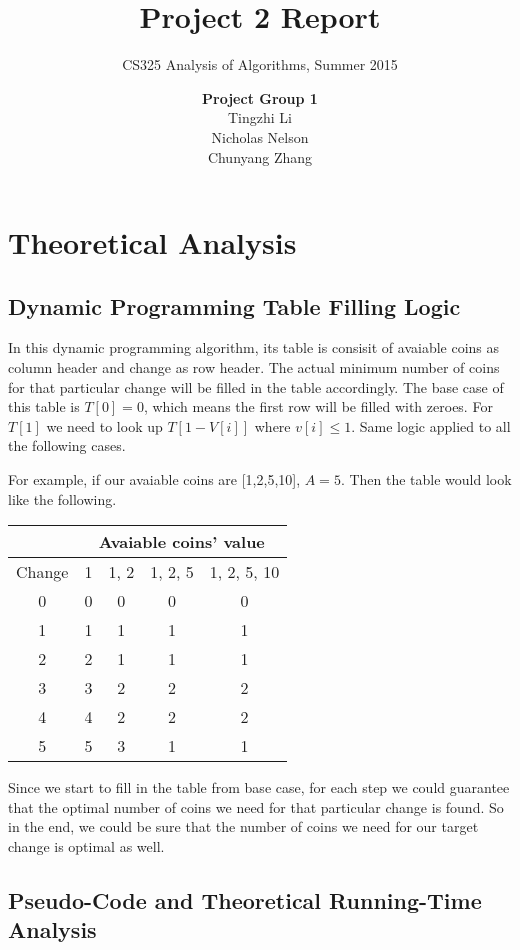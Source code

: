 \documentclass[11pt]{scrreprt}
\title{\textbf{Project 2 Report}}
\subtitle{CS325 Analysis of Algorithms, Summer 2015}
\author{\textsf{\textbf{Project Group 1}}\\
		\textsf{Tingzhi Li}\\
		\textsf{Nicholas Nelson}\\
		\textsf{Chunyang Zhang}}
\date{}
\begin{document}
\maketitle


\chapter{Theoretical Analysis}

\section{Dynamic Programming Table Filling Logic}

In this dynamic programming algorithm, its table is consisit of avaiable coins as column header and change as row header. The actual minimum number of coins for that particular change will be filled in the table accordingly. The base case of this table is $T[0]=0$, which means the first row will be filled with zeroes. For $T[1]$ we need to look up $T[1-V[i]]$ where $v[i]\leq 1$. Same logic applied to all the following cases.

For example, if our avaiable coins are [1,2,5,10], $A=5$. Then the table would look like the following.

\begin{tabular}{|c|c|c|c|c|}
	\hline & \multicolumn{4}{|c|}{Avaiable coins' value} \\
	\hline Change & 1  & 1, 2 & 1, 2, 5 & 1, 2, 5, 10 \\ 
	\hline 0 & 0 & 0 & 0 & 0 \\ 
	\hline 1 & 1 & 1 & 1 & 1 \\ 
	\hline 2 & 2 & 1 & 1 & 1 \\ 
	\hline 3 & 3 & 2 & 2 & 2 \\ 
	\hline 4 & 4 & 2 & 2 & 2 \\ 
	\hline 5 & 5 & 3 & 1 & 1 \\ 
	\hline 
\end{tabular} 

Since we start to fill in the table from base case, for each step we could guarantee that the optimal number of coins we need for that particular change is found. So in the end, we could be sure that the number of coins we need for our target change is optimal as well.


\section {Pseudo-Code and Theoretical Running-Time Analysis}
\end{document}
